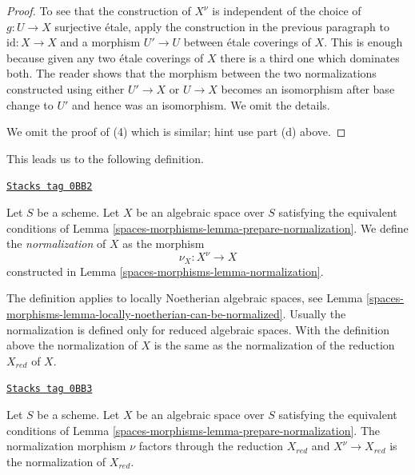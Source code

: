 \begin{proof}
\medskip\noindent
To see that the construction of $X^\nu$ is independent of the choice
of $g : U \to X$ surjective \'etale, apply the construction in the
previous paragraph to $\text{id} : X \to X$ and a morphism
$U' \to U$ between \'etale coverings of $X$. This is enough because
given any two \'etale coverings of $X$ there is a third one which
dominates both. The reader shows that the morphism between the two
normalizations constructed using either $U' \to X$ or $U \to X$
becomes an isomorphism after base change to $U'$ and hence was
an isomorphism. We omit the details.

\medskip\noindent
We omit the proof of (4) which is similar; hint use part (d) above.
\end{proof}

This leads us to the following definition.

\begin{definition}[Normalization]
\label{spaces-morphisms-definition-normalization}
\href{https://stacks.math.columbia.edu/tag/0BB2}{\texttt{Stacks tag 0BB2}}

Let $S$ be a scheme. Let $X$ be an algebraic space over $S$ satisfying the
equivalent conditions of Lemma \ref{spaces-morphisms-lemma-prepare-normalization}.
We define the {\it normalization} of $X$ as the morphism
$$
\nu_X : X^\nu \longrightarrow X
$$
constructed in Lemma \ref{spaces-morphisms-lemma-normalization}.
\end{definition}

The definition applies to locally Noetherian algebraic
spaces, see Lemma \ref{spaces-morphisms-lemma-locally-noetherian-can-be-normalized}.
Usually the normalization is defined only for reduced algebraic
spaces. With the definition above the normalization of $X$ is the same
as the normalization of the reduction $X_{red}$ of $X$.

\begin{lemma}
\label{spaces-morphisms-lemma-normalization-reduced}
\href{https://stacks.math.columbia.edu/tag/0BB3}{\texttt{Stacks tag 0BB3}}

Let $S$ be a scheme. Let $X$ be an algebraic space over $S$ satisfying the
equivalent conditions of Lemma \ref{spaces-morphisms-lemma-prepare-normalization}.
The normalization morphism $\nu$ factors through the reduction $X_{red}$
and $X^\nu \to X_{red}$ is the normalization of $X_{red}$.
\end{lemma}

